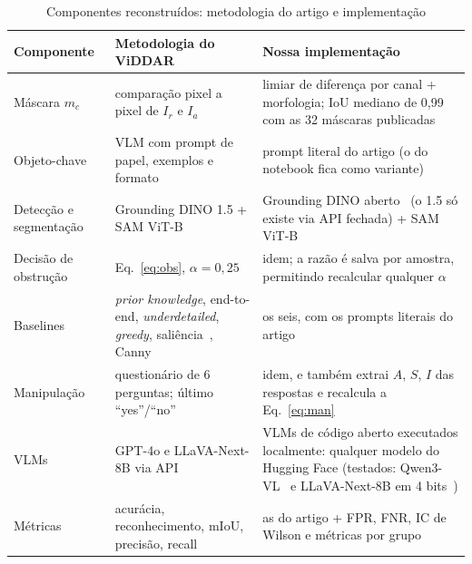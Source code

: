 \documentclass[journal,onecolumn]{IEEEtran}
\newcommand{\Ir}{I_r}
\newcommand{\Ia}{I_a}
\begin{document}
\begin{table}[!t]
\renewcommand{\arraystretch}{1.2}
\caption{Componentes reconstruídos: metodologia do artigo e implementação}
\label{tab:reconstrucao}
\centering
\footnotesize
\begin{tabular}{L{3.0cm}L{5.4cm}L{6.8cm}}
\toprule
Componente & Metodologia do ViDDAR~\cite{viddar} & Nossa implementação \\
\midrule
Máscara $m_c$ & comparação pixel a pixel de $\Ir$ e $\Ia$ & limiar de diferença por canal + morfologia; IoU mediano de 0,99 com as 32 máscaras publicadas \\
Objeto-chave & VLM com prompt de papel, exemplos e formato & prompt literal do artigo (o do notebook fica como variante) \\
Detecção e segmentação & Grounding DINO 1.5 + SAM ViT-B & Grounding DINO aberto~\cite{groundingdino} (o 1.5 só existe via API fechada) + SAM ViT-B~\cite{sam} \\
Decisão de obstrução & Eq.~\eqref{eq:obs}, $\alpha=0{,}25$ & idem; a razão é salva por amostra, permitindo recalcular qualquer $\alpha$ \\
Baselines & \emph{prior knowledge}, end-to-end, \emph{underdetailed}, \emph{greedy}, saliência~\cite{hou2007}, Canny~\cite{canny} & os seis, com os prompts literais do artigo \\
Manipulação & questionário de 6 perguntas; último ``yes''/``no'' & idem, e também extrai $A$, $S$, $I$ das respostas e recalcula a Eq.~\eqref{eq:man} \\
VLMs & GPT-4o e LLaVA-Next-8B via API & VLMs de código aberto executados localmente: qualquer modelo do Hugging Face (testados: Qwen3-VL~\cite{qwen3vl} e LLaVA-Next-8B em 4 bits~\cite{qlora}) \\
Métricas & acurácia, reconhecimento, mIoU, precisão, recall & as do artigo + FPR, FNR, IC de Wilson e métricas por grupo \\
\bottomrule
\end{tabular}
\end{table}
\end{document}
